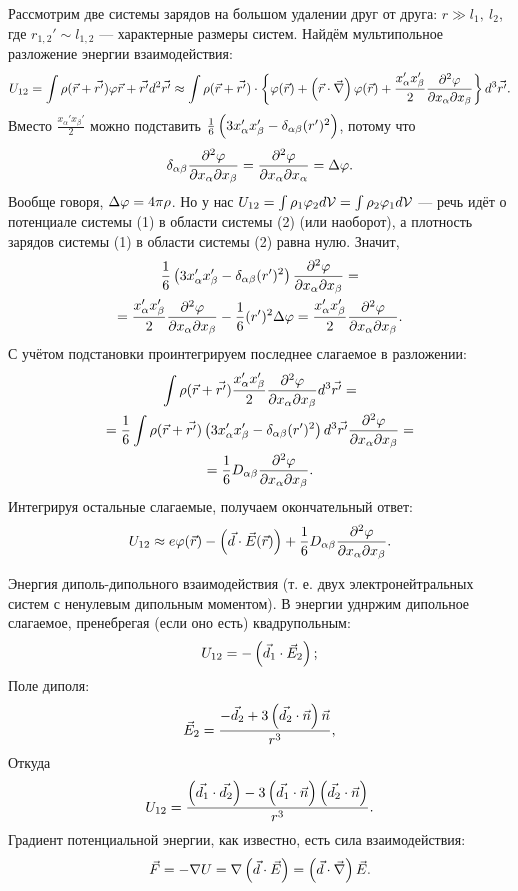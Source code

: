     Рассмотрим две системы зарядов на большом удалении друг от друга: $r \gg l_1, \: l_2$, где $r_{1,2}' \sim l_{1,2}$ --- характерные размеры систем.
    Найдём мультипольное разложение энергии взаимодействия:
    \begin{gather*}
        U_{12} = \int\rho(\vec{r} + \vec{r'})\varphi{\vec{r} + \vec{r'}}d^2\vec{r'} \approx
        \int\rho(\vec{r} + \vec{r'}) \cdot \left\{{\varphi(\vec{r}) + \left({\vec{r}\cdot\vec{\nabla}}\right) \varphi(\vec{r}) + \frac{x_{\alpha}'x_{\beta}'}{2} \frac{\partial^2\varphi}{\partial x_{\alpha}\partial x_{\beta}}}\right\} d^3\vec{r'}.
    \end{gather*}
    Вместо $\frac{x_{\alpha}'x_{\beta}'}{2}$ можно подставить $\frac 16 \left({3x_{\alpha}'x_{\beta}' - \delta_{\alpha\beta}(r')^2}\right)$, потому что
    \[
        \delta_{\alpha\beta}\frac{\partial^2\varphi}{\partial x_{\alpha}\partial x_{\beta}} = \frac{\partial^2\varphi}{\partial x_{\alpha}\partial x_{\alpha}} = \Delta\varphi.
    \]
    Вообще говоря, $\Delta\varphi = 4\pi\rho$. Но у нас $U_{12} = \int\rho_1\varphi_2 d\mathcal{V} = \int\rho_2\varphi_1 d\mathcal{V}$ --- речь идёт о потенциале системы (1) в области системы (2) (или наоборот),
    а плотность зарядов системы (1) в области системы (2) равна нулю. Значит,
    \begin{gather*}
        \frac 16 \left({3x_{\alpha}'x_{\beta}' - \delta_{\alpha\beta}(r')^2}\right) \frac{\partial^2\varphi}{\partial x_{\alpha}\partial x_{\beta}} = \\
        = \frac{x_{\alpha}'x_{\beta}'}{2} \frac{\partial^2\varphi}{\partial x_{\alpha}\partial x_{\beta}} - \frac 16 (r')^2 \Delta\varphi = \frac{x_{\alpha}'x_{\beta}'}{2} \frac{\partial^2\varphi}{\partial x_{\alpha}\partial x_{\beta}}.
    \end{gather*}
    С учётом подстановки проинтегрируем последнее слагаемое в разложении:
    \begin{gather*}
        \int \rho(\vec{r} + \vec{r'}) \frac{x_{\alpha}'x_{\beta}'}{2} \frac{\partial^2\varphi}{\partial x_{\alpha}\partial x_{\beta}} d^3\vec{r'} = \\
        = \frac 16\int \rho(\vec{r} + \vec{r'}) \left({3x_{\alpha}'x_{\beta}' - \delta_{\alpha\beta}(r')^2}\right) d^3\vec{r'} \frac{\partial^2\varphi}{\partial x_{\alpha}\partial x_{\beta}} = \\
        = \frac 16 D_{\alpha\beta} \frac{\partial^2\varphi}{\partial x_{\alpha}\partial x_{\beta}}.
    \end{gather*}
    Интегрируя остальные слагаемые, получаем окончательный ответ:
    \[
        U_{12} \approx e\varphi(\vec{r}) - \left({\vec{d}\cdot\vec{E}(\vec{r})}\right) + \frac 16 D_{\alpha\beta} \frac{\partial^2\varphi}{\partial x_{\alpha}\partial x_{\beta}}.
    \]

    \begin{example} Энергия диполь-дипольного взаимодействия 
        (т. е. двух электронейтральных систем с ненулевым дипольным моментом). В энергии уднржим дипольное слагаемое,
        пренебрегая (если оно есть) квадрупольным:
        \[
            U_{12} = - \left({\vec{d}_1 \cdot \vec{E}_2}\right);
        \]
        Поле диполя:
        \[
            \vec{E}_2 = \frac{-\vec{d}_2 + 3\left({\vec{d_2}\cdot\vec{n}}\right)\vec{n}}{r^3},
        \]
        Откуда
        \[
            U_{12} = \frac{\left({\vec{d_1}\cdot\vec{d_2}}\right) - 3\left({\vec{d_1}\cdot\vec{n}}\right)\left({\vec{d_2}\cdot\vec{n}}\right)}{r^3}.
        \]
        Градиент потенциальной энергии, как известно, есть сила взаимодействия:
        \[
            \vec{F} = -\nabla U = \nabla\left({\vec{d}\cdot\vec{E}}\right) = \left({\vec{d}\cdot\vec{\nabla}}\right)\vec{E}.
        \]
    \end{example}

